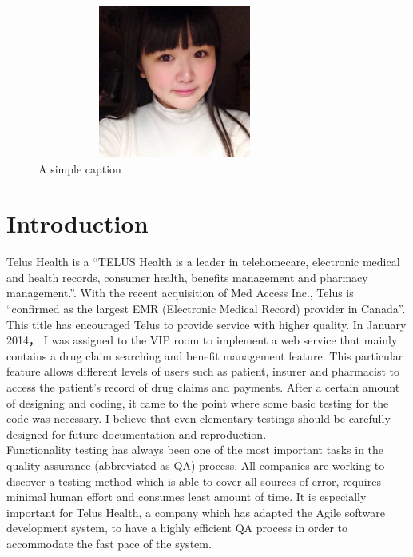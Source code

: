 \documentclass[12pt]{article}
\begin{document}
\begin{figure}[ht!]
\centering
\includegraphics[width=90mm,height=5cm,keepaspectratio]{img/aaa.jpg}
\caption{A simple caption}
\label{overflow}
\end{figure}


\newpage

\toc


\section{Introduction}

Telus Health is a “TELUS Health is a leader in telehomecare, electronic medical and health records, consumer health, benefits management and pharmacy management.”\cite{telusComp}. With the recent acquisition of Med Access Inc., Telus is “confirmed as the largest EMR (Electronic Medical Record) provider in Canada”\cite{telusComp}. This title has encouraged Telus to provide service with higher quality. In January 2014， I was assigned to the VIP room to implement a web service that mainly contains a drug claim searching and benefit management feature. This particular feature allows different levels of users such as patient, insurer and pharmacist to access the patient's record of drug claims and payments. After a certain amount of designing and coding, it came to the point where some basic testing for the code was necessary. I believe that even elementary testings should be carefully designed for future documentation and reproduction. \\

Functionality testing has always been one of the most important tasks in the quality assurance (abbreviated as QA) process. All companies are working to discover a testing method which is able to cover all sources of error, requires minimal human effort and consumes least amount of time. It is especially important for Telus Health, a company which has adapted the Agile software development system, to have a highly efficient QA process in order to accommodate the fast pace of the system.\\
\end{document}
